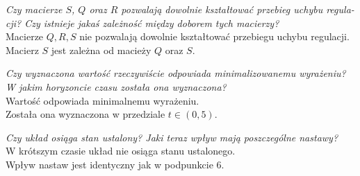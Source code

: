 \documentclass[12pt, letterpaper]{article}
\begin{document}
\begin{enumerate}


            \emph{Czy macierze $S$, $Q$ oraz $R$ pozwalają dowolnie kształtować przebieg uchybu regula-
            cji? Czy istnieje jakaś zależność między doborem tych macierzy?}\\
            Macierze $Q, R, S$ nie pozwalają dowolnie kształtować przebiegu uchybu regulacji.
            Macierz $S$ jest zależna od macieży $Q$ oraz $S$.



            \emph{Czy wyznaczona wartość rzeczywiście odpowiada minimalizowanemu wyrażeniu?
            W jakim horyzoncie czasu została ona wyznaczona?}\\
            Wartość odpowiada minimalnemu wyrażeniu.\\
            Została ona wyznaczona w przedziale $t \in (0, 5)$.


            \emph{Czy układ osiąga stan ustalony? Jaki teraz wpływ mają poszczególne nastawy?}\\
            W krótszym czasie układ nie osiąga stanu ustalonego.\\
            Wpływ nastaw jest identyczny jak w podpunkcie 6.
            
    \end{enumerate}
\end{document}
